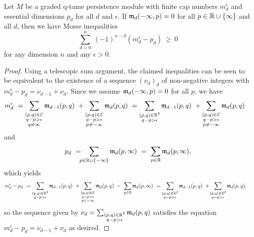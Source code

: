 \begin{thm} \label{t:inequalities}
	Let $M$ be a graded q-tame persistence module with finite cap numbers $m_{d}^{\epsilon}$ and essential dimensions $p_{d}$ for all $d$ and $\epsilon$.
	If $\mathfrak{m}_d(-\infty, p) = 0$ for all $p \in \mathbb{R} \cup \{\infty\}$ and all $d$, then we have Morse inequalities
	\begin{equation} \label{e:morse inequalities}
	\sum_{d=0}^n \ (-1)^{n-d} (m^{\epsilon}_{d} - p_{d}) \ \geq\ 0
	\end{equation}
	for any dimension $n$ and any $\epsilon > 0$.
\end{thm}

\begin{proof}
	Using a telescopic sum argument, the claimed inequalities can be seen to be equivalent to the existence of a sequence $(\nu_d)_d$ of non-negative integers with $m^{\epsilon}_{d} - p_{d} = \nu_{d-1} + \nu_{d}$.
	Since we assume $\mathfrak{m}_d(-\infty, p) = 0$ for all $p$, we have
	\begin{align*}
	m^{\epsilon}_{d} \ &=
	\sum_{\substack{(p,q) \in \mathcal{E} \\ q-p > \epsilon \\ q \neq \infty}} \mathfrak{m}_{d-1}(p,q) \ +
	\sum_{\substack{(p,q) \in \mathcal{E} \\ q-p > \epsilon \\ p \neq -\infty}} \mathfrak{m}_d(p,q) \ =
	\sum_{\substack{(p,q) \in \mathbb{R}^2 \\ q-p > \epsilon }} \mathfrak{m}_{d-1}(p,q) \ +
	\sum_{\substack{(p,q) \in \mathcal{E} \\ q-p > \epsilon \\ p \neq -\infty}} \mathfrak{m}_d(p,q)
	\end{align*}
	and
	\begin{equation*}
	p_{d} \ = \!\!\!
	\sum_{p \in \mathbb{R} \cup \{-\infty\}} \mathfrak{m}_d(p,\infty) \ = \
	\sum_{p \in \mathbb{R}} \mathfrak{m}_d(p,\infty),
	\end{equation*}
	which yields
	\begin{align*}
	m^{\epsilon}_{d} - p_{d} \ &= 
	\sum_{\substack{(p,q) \in \mathbb{R}^2 \\ q-p > \epsilon}} \mathfrak{m}_{d-1}(p,q) \ +
	\sum_{\substack{(p,q) \in \mathcal{E} \\ q-p > \epsilon \\ p \neq -\infty}} \mathfrak{m}_d(p,q) \ - \
	\sum_{p \in \mathbb{R}} \mathfrak{m}_d(p,\infty) \ =
	\sum_{\substack{(p,q) \in \mathbb{R}^2 \\ q-p > \epsilon}} \mathfrak{m}_{d-1}(p,q)
	\ + \!
	\sum_{\substack{(p,q) \in \mathbb{R}^2 \\ q-p > \epsilon}} \mathfrak{m}_d(p,q),
	\end{align*}
	so the sequence given by $\nu_d = \sum_{\substack{(p,q) \in \mathbb{R}^2 \\ q-p > \epsilon}} \mathfrak{m}_d(p,q)$ satisfies the equation $m^{\epsilon}_{d} - p_{d} = \nu_{d-1} + \nu_{d}$ as desired.
\end{proof}

